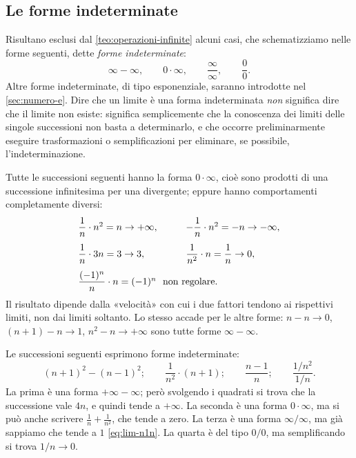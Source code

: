\subsection{Le forme indeterminate}

Risultano esclusi dal \cref{teo:operazioni-infinite} alcuni casi, che schematizziamo
nelle forme seguenti, dette \emph{forme indeterminate}:
\begin{equation}\label{eq:forme-indeterminate}
  \infty-\infty, \qquad 0\cdot\infty, \qquad \frac\infty\infty, \qquad \frac00 .
\end{equation}
Altre forme indeterminate, di tipo esponenziale, saranno introdotte nel
\cref{sec:numero-e}. Dire che un limite è una forma indeterminata \emph{non} significa dire
che il limite non esiste: significa semplicemente che la conoscenza dei limiti delle
singole successioni non basta a determinarlo, e che occorre preliminarmente eseguire
trasformazioni o semplificazioni per eliminare, se possibile, l'indeterminazione.

\begin{esempio}\label{es:zero-per-infinito}
Tutte le successioni seguenti hanno la forma $0\cdot\infty$, cioè sono prodotti di una
successione infinitesima per una divergente; eppure hanno comportamenti completamente
diversi:
\[
\renewcommand{\arraystretch}{1.6}
\begin{array}{ll}
  \dfrac1n\cdot n^{2}=n\to+\infty, \qquad & -\dfrac1n\cdot n^{2}=-n\to-\infty,\\[2ex]
  \dfrac1n\cdot 3n=3\to3, & \dfrac1{n^{2}}\cdot n=\dfrac1n\to0,\\[2ex]
  \multicolumn{2}{l}{\dfrac{(-1)^{n}}{n}\cdot n=(-1)^{n}\ \text{ non regolare}.}
\end{array}
\]
Il risultato dipende dalla «velocità» con cui i due fattori tendono ai rispettivi limiti,
non dai limiti soltanto. Lo stesso accade per le altre forme: $n-n\to0$,
$(n+1)-n\to1$, $n^{2}-n\to+\infty$ sono tutte forme $\infty-\infty$.
\end{esempio}

\begin{esempio}\label{es:forme-indeterminate}
Le successioni seguenti esprimono forme indeterminate:
\begin{equation}\label{eq:es-forme}
  (n+1)^{2}-(n-1)^{2}; \qquad \frac1{n^{2}}\cdot(n+1); \qquad \frac{n-1}{n}; \qquad
  \frac{1/n^{2}}{1/n}.
\end{equation}
La prima è una forma $+\infty-\infty$; però svolgendo i quadrati si trova che la
successione vale $4n$, e quindi tende a $+\infty$. La seconda è una forma $0\cdot\infty$,
ma si può anche scrivere $\frac1n+\frac1{n^{2}}$, che tende a zero. La terza è una forma
$\infty/\infty$, ma già sappiamo che tende a $1$ \eqref{eq:lim-n1n}. La quarta è del tipo
$0/0$, ma semplificando si trova $1/n\to0$.
\end{esempio}

